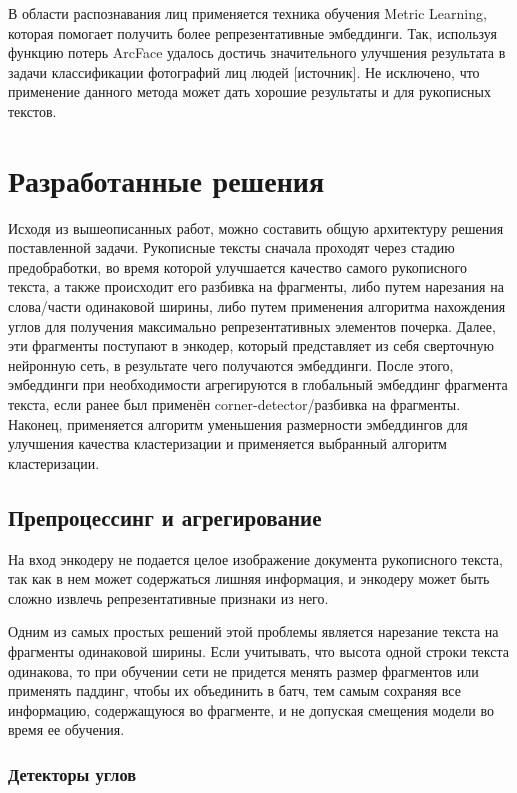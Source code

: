    В области распознавания лиц применяется техника обучения Metric Learning, которая помогает получить более репрезентативные эмбеддинги. Так, используя функцию потерь ArcFace удалось достичь значительного улучшения результата в задачи классификации фотографий лиц людей [источник]. Не исключено, что применение данного метода может дать хорошие результаты и для рукописных текстов.
    
\newpage
\section{Разработанные решения}
    Исходя из вышеописанных работ, можно составить общую архитектуру решения поставленной задачи. Рукописные тексты сначала проходят через стадию предобработки, во время которой улучшается качество самого рукописного текста, а также происходит его разбивка на фрагменты, либо путем нарезания на слова/части одинаковой ширины, либо путем применения алгоритма нахождения углов для получения максимально репрезентативных элементов почерка.
    Далее, эти фрагменты поступают в энкодер, который представляет из себя сверточную нейронную сеть, в результате чего получаются эмбеддинги. После этого, эмбеддинги при необходимости агрегируются в глобальный эмбеддинг фрагмента текста, если ранее был применён corner-detector/разбивка на фрагменты. Наконец, применяется алгоритм уменьшения размерности эмбеддингов для улучшения качества кластеризации и применяется выбранный алгоритм кластеризации.

\subsection{Препроцессинг и агрегирование}

    На вход энкодеру не подается целое изображение документа рукописного текста, так как в нем может содержаться лишняя информация, и энкодеру может быть сложно извлечь репрезентативные признаки из него.

    Одним из самых простых решений этой проблемы является нарезание текста на фрагменты одинаковой ширины. Если учитывать, что высота одной строки текста одинакова, то при обучении сети не придется менять размер фрагментов или применять паддинг, чтобы их объединить в батч, тем самым сохраняя все информацию, содержащуюся во фрагменте, и не допуская смещения модели во время ее обучения. 

\subsubsection{Детекторы углов}

